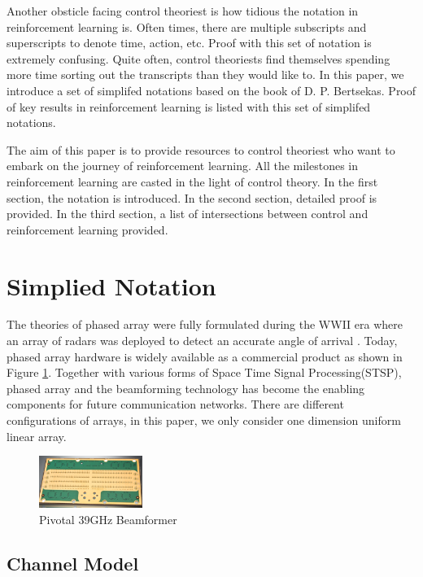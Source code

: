 \documentclass[journal]{IEEEtran}
\begin{document}
Another obsticle facing control theoriest is how tidious the notation in reinforcement learning is. Often times, there are multiple subscripts and superscripts to denote time, action, etc. Proof with this set of notation is extremely confusing. Quite often, control theoriests find themselves spending more time sorting out the transcripts than they would like to. In this paper, we introduce a set of simplifed notations based on the book of D. P. Bertsekas. Proof of key results in reinforcement learning is listed with this set of simplifed notations.

The aim of this paper is to provide resources to control theoriest who want to embark on the journey of reinforcement learning. All the milestones in reinforcement learning are casted in the light of control theory. In the first section, the notation is introduced. In the second section, detailed proof is provided. In the third section, a list of intersections between control and reinforcement learning provided.
\section{Simplied Notation}
The theories of phased array were fully formulated during the WWII era where an array of radars was deployed to detect an accurate angle of arrival \cite{5237174}. Today, phased array hardware is widely available as a commercial product as shown in Figure \ref{fig:pivotal}. Together with various forms of Space Time Signal Processing(STSP), phased array and the beamforming technology has become the enabling components for future communication networks. There are different configurations of arrays, in this paper, we only consider one dimension uniform linear array.

\begin{figure}[H]
\centering
\includegraphics[width=0.3\textwidth]{beamformer.png}
\caption{Pivotal 39GHz Beamformer}
\label{fig:pivotal}
\end{figure}
\subsection{Channel Model}
\end{document}
